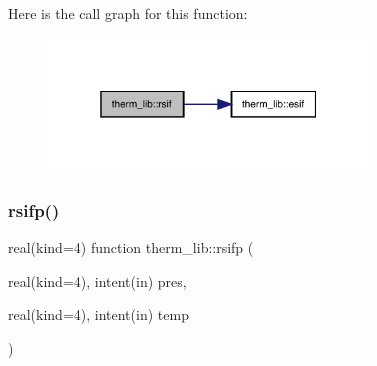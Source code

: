 Here is the call graph for this function\+:
\nopagebreak
\begin{figure}[H]
\begin{center}
\leavevmode
\includegraphics[width=241pt]{namespacetherm__lib_a16031b6116a46111467e9923e566dd49_cgraph}
\end{center}
\end{figure}
\mbox{\label{namespacetherm__lib_a55d327a08b380623cd2b036cecdef9f2}} 
\subsubsection{\texorpdfstring{rsifp()}{rsifp()}}
{\footnotesize\ttfamily real(kind=4) function therm\+\_\+lib\+::rsifp (\begin{DoxyParamCaption}\item[{real(kind=4), intent(in)}]{pres,  }\item[{real(kind=4), intent(in)}]{temp }\end{DoxyParamCaption})}

